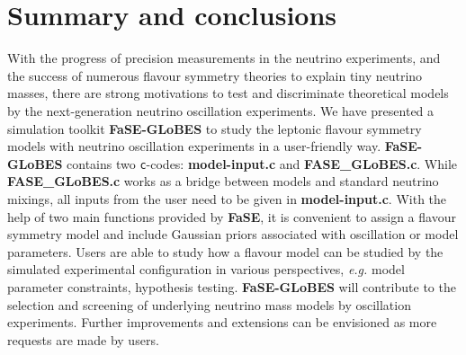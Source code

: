 \documentclass[aps,prd,nofootinbib,preprint]{revtex4}
\begin{document}
\section{Summary and conclusions}

With the progress of precision measurements in the neutrino experiments, and the success of numerous flavour symmetry theories to explain tiny neutrino masses, there are strong motivations to test and discriminate theoretical models by the next-generation neutrino oscillation experiments. We have presented a simulation toolkit \textbf{FaSE-GLoBES} to study the leptonic flavour symmetry models with neutrino oscillation experiments in a user-friendly way. \textbf{FaSE-GLoBES} contains two \texttt{c}-codes: \textbf{model-input.c} and \textbf{FASE\_GLoBES.c}. While \textbf{FASE\_GLoBES.c} works as a bridge between models and standard neutrino mixings, all inputs from the user need to be given in \textbf{model-input.c}. With the help of two main functions provided by \textbf{FaSE}, it is convenient to assign a flavour symmetry model and include Gaussian priors associated with oscillation or model parameters. Users are able to study how a flavour model can be studied by the simulated experimental configuration in various perspectives, \textit{e.g.} model parameter constraints, hypothesis testing. \textbf{FaSE-GLoBES} will contribute to the selection and screening of underlying neutrino mass models by oscillation experiments. Further improvements and extensions can be envisioned as more requests are made by users.




%
%
%

\end{document}
